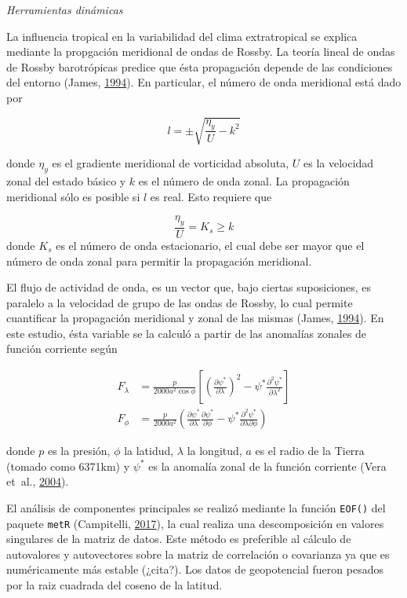 \documentclass[spanish,a4paper,12pt]{book}
\begin{document}
\emph{Herramientas dinámicas}

La influencia tropical en la variabilidad del clima extratropical se
explica mediante la propgación meridional de ondas de Rossby. La teoría
lineal de ondas de Rossby barotrópicas predice que ésta propagación
depende de las condiciones del entorno (James,
\protect\hyperlink{ref-James}{1994}). En particular, el número de onda
meridional está dado por

\[
l = \pm \sqrt{\frac{\eta_{y}}{U} - k^2}
\]

donde \(\eta_{y}\) es el gradiente meridional de vorticidad absoluta,
\(U\) es la velocidad zonal del estado básico y \(k\) es el número de
onda zonal. La propagación meridional sólo es posible si \(l\) es real.
Esto requiere que

\[
\frac{\eta_{y}}{U} = K_s \ge k 
\] donde \(K_s\) es el número de onda estacionario, el cual debe ser
mayor que el número de onda zonal para permitir la propagación
meridional.

El flujo de actividad de onda, es un vector que, bajo ciertas
suposiciones, es paralelo a la velocidad de grupo de las ondas de
Rossby, lo cual permite cuantificar la propagación meridional y zonal de
las mismas (James, \protect\hyperlink{ref-James}{1994}). En este
estudio, ésta variable se la calculó a partir de las anomalías zonales
de función corriente según

\[
\begin{aligned}
F_\lambda &= \frac{p}{2000a^2\cos\phi}\left[ \left( \frac{\partial \psi^*}{\partial \lambda} \right)^2 - \psi^*\frac{\partial^2 \psi^*}{\partial \lambda^2}  \right] \\
F_\phi &= \frac{p}{2000a^2} \left( \frac{\partial \psi^*}{\partial \lambda}\frac{\partial \psi^*}{\partial \phi}  - \psi^* \frac{\partial^2 \psi^*}{\partial \lambda \partial \phi} \right) 
\end{aligned}
\]

donde \(p\) es la presión, \(\phi\) la latidud, \(\lambda\) la longitud,
\(a\) es el radio de la Tierra (tomado como 6371km) y \(\psi^*\) es la
anomalía zonal de la función corriente (Vera et~al.,
\protect\hyperlink{ref-Vera2004}{2004}).

El análisis de componentes principales se realizó mediante la función
\texttt{EOF()} del paquete \texttt{metR} (Campitelli,
\protect\hyperlink{ref-R-metR}{2017}), la cual realiza una
descomposición en valores singulares de la matriz de datos. Este método
es preferible al cálculo de autovalores y autovectores sobre la matriz
de correlación o covarianza ya que es numéricamente más estable
(¿cita?). Los datos de geopotencial fueron pesados por la raiz cuadrada
del coseno de la latitud.
\end{document}
